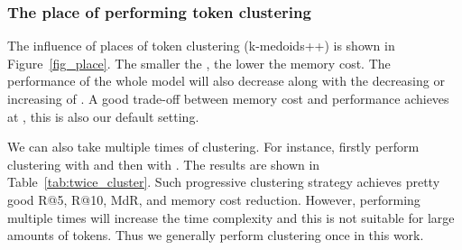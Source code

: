 \documentclass[sigconf]{acmart}
\begin{document}
\subsubsection{The place of performing token clustering}
The influence of places of token clustering (k-medoids++)
is shown in Figure~\ref{fig_place}.
The smaller the , the lower the memory cost.
The performance of the whole model will also decrease along
with the decreasing or increasing of .
A good trade-off between memory cost and performance achieves at ,
this is also our default setting.

We can also take multiple times of clustering.
For instance, firstly perform clustering with 
and then with .
The results are shown in Table~\ref{tab:twice_cluster}.
Such progressive clustering strategy achieves pretty good R@5,
R@10, MdR, and memory cost reduction.
However, performing multiple times will increase the time complexity
and this is not suitable for large amounts of tokens.
Thus we generally perform clustering once in this work.


\begin{table}[tbp]
\centering
	\caption{Performing clustering twice on LSMDC.}
	\label{tab:twice_cluster}
\end{table}
\end{document}
